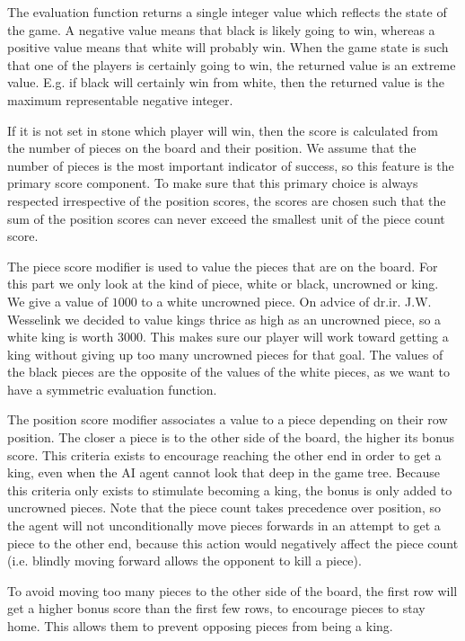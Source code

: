 \documentclass[11pt,a4paper]{article}
\begin{document}
The evaluation function returns a single integer value which reflects the state of the game. A negative value means that black is likely going to win, whereas a positive value means that white will probably win. When the game state is such that one of the players is certainly going to win, the returned value is an extreme value. E.g. if black will certainly win from white, then the returned value is the maximum representable negative integer.

If it is not set in stone which player will win, then the score is calculated from the number of pieces on the board and their position.
We assume that the number of pieces is the most important indicator of success, so this feature is the primary score component. To make sure that this primary choice is always respected irrespective of the position scores, the scores are chosen such that the sum of the position scores can never exceed the smallest unit of the piece count score.

The piece score modifier is used to value the pieces that are on the board. For this part we only look at the kind of piece, white or black, uncrowned or king. We give a value of $1000$ to a white uncrowned piece. On advice of dr.ir. J.W. Wesselink we decided to value kings thrice as high as an uncrowned piece, so a white king is worth $3000$. This makes sure our player will work toward getting a king without giving up too many uncrowned pieces for that goal. The values of the black pieces are the opposite of the values of the white pieces, as we want to have a symmetric evaluation function.

The position score modifier associates a value to a piece depending on their row position. The closer a piece is to the other side of the board, the higher its bonus score. This criteria exists to encourage reaching the other end in order to get a king, even when the AI agent cannot look that deep in the game tree. Because this criteria only exists to stimulate becoming a king, the bonus is only added to uncrowned pieces. Note that the piece count takes precedence over position, so the agent will not unconditionally move pieces forwards in an attempt to get a piece to the other end, because this action would negatively affect the piece count (i.e. blindly moving forward allows the opponent to kill a piece).

To avoid moving too many pieces to the other side of the board, the first row will get a higher bonus score than the first few rows, to encourage pieces to stay home. This allows them to prevent opposing pieces from being a king.
\end{document}
